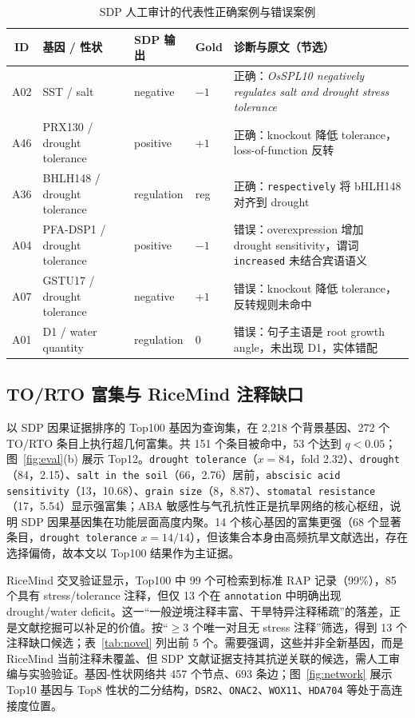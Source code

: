 \documentclass[conference]{IEEEtran}
\begin{document}
\begin{table}[t]
  \centering
  \fontsize{6.7pt}{7.7pt}\selectfont
  \renewcommand{\arraystretch}{0.74}
  \setlength{\tabcolsep}{3.0pt}
  \caption{SDP 人工审计的代表性正确案例与错误案例}
  \label{tab:audit}
  \begin{tabularx}{\textwidth}{c p{2.6cm} p{2.6cm} p{1.4cm} X}
    \toprule
    ID & 基因 / 性状 & SDP 输出 & Gold & 诊断与原文（节选） \\
    \midrule
    A02 & SST / salt & negative & $-1$ & 正确：\textit{OsSPL10 negatively regulates salt and drought stress tolerance} \\
    A46 & PRX130 / drought tolerance & positive & $+1$ & 正确：knockout 降低 tolerance，loss-of-function 反转 \\
    A36 & BHLH148 / drought tolerance & regulation & reg & 正确：\texttt{respectively} 将 bHLH148 对齐到 drought \\
    A04 & PFA-DSP1 / drought tolerance & positive & $-1$ & 错误：overexpression 增加 drought sensitivity，谓词 \texttt{increased} 未结合宾语语义 \\
    A07 & GSTU17 / drought tolerance & negative & $+1$ & 错误：knockout 降低 tolerance，反转规则未命中 \\
    A01 & D1 / water quantity & regulation & 0 & 错误：句子主语是 root growth angle，未出现 D1，实体错配 \\
    \bottomrule
  \end{tabularx}
\end{table}

\subsection{TO/RTO 富集与 RiceMind 注释缺口}
以 SDP 因果证据排序的 Top100 基因为查询集，在 2,218 个背景基因、272 个 TO/RTO 条目上执行超几何富集。共 151 个条目被命中，53 个达到 $q<0.05$；图~\ref{fig:eval}(b) 展示 Top12。\texttt{drought tolerance}（$x=84$，fold 2.32）、\texttt{drought}（84，2.15）、\texttt{salt in the soil}（66，2.76）居前，\texttt{abscisic acid sensitivity}（13，10.68）、\texttt{grain size}（8，8.87）、\texttt{stomatal resistance}（17，5.54）显示强富集；ABA 敏感性与气孔抗性正是抗旱网络的核心枢纽，说明 SDP 因果基因集在功能层面高度内聚。14 个核心基因的富集更强（68 个显著条目，\texttt{drought tolerance} $x=14/14$），但该集合本身由高频抗旱文献选出，存在选择偏倚，故本文以 Top100 结果作为主证据。

RiceMind 交叉验证显示，Top100 中 99 个可检索到标准 RAP 记录（99\%），85 个具有 stress/tolerance 注释，但仅 13 个在 \texttt{annotation} 中明确出现 drought/water deficit。这一“一般逆境注释丰富、干旱特异注释稀疏”的落差，正是文献挖掘可以补足的价值。按“$\ge3$ 个唯一对且无 stress 注释”筛选，得到 13 个注释缺口候选；表~\ref{tab:novel} 列出前 5 个。需要强调，这些并非全新基因，而是 RiceMind 当前注释未覆盖、但 SDP 文献证据支持其抗逆关联的候选，需人工审编与实验验证。基因-性状网络共 457 个节点、693 条边；图~\ref{fig:network} 展示 Top10 基因与 Top8 性状的二分结构，\texttt{DSR2}、\texttt{ONAC2}、\texttt{WOX11}、\texttt{HDA704} 等处于高连接度位置。
\end{document}
